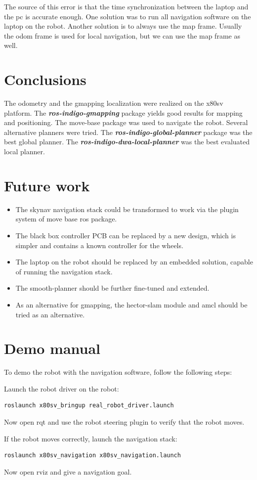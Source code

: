 \documentclass[a4paper]{article}
\newcommand{\rospackage}[1]{\textbf{\textit{ros-indigo-#1}}}
\begin{document}
The source of this error is that the time synchronization between the laptop and the pc is accurate enough.
One solution was to run all navigation software on the laptop on the robot.
Another solution is to always use the map frame. Usually the odom frame is used for local navigation,
but we can
use the map frame as well.

\section{Conclusions}
The odometry and the gmapping localization were realized on the x80sv platform.
The \rospackage{gmapping} package yields good results for mapping and positioning.
The move-base package was used to navigate the robot. Several alternative planners were
tried. The \rospackage{global-planner} package was the best global planner. The \rospackage{dwa-local-planner}
was the best evaluated local planner.


\section{Future work}

\begin{itemize}
  \item The skynav navigation stack could be transformed to work via the plugin system of
    move base ros package.
  \item The black box controller PCB can be replaced by a new design, which is simpler
    and contains a known controller for the wheels.
  \item The laptop on the robot should be replaced by an embedded solution, capable of
    running the navigation stack.
  \item The smooth-planner should be further fine-tuned and extended.
  \item As an alternative for gmapping, the hector-slam module and amcl \cite{amcl}
    should be tried as an alternative.
\end{itemize}

\appendix

\section{Demo manual}
To demo the robot with the navigation software, follow the following steps:

Launch the robot driver on the robot:
\begin{lstlisting}
roslaunch x80sv_bringup real_robot_driver.launch
\end{lstlisting}

Now open rqt and use the robot steering plugin to verify that the robot moves.

If the robot moves correctly, launch the navigation stack:
\begin{lstlisting}
roslaunch x80sv_navigation x80sv_navigation.launch
\end{lstlisting}

Now open rviz and give a navigation goal.
\end{document}
